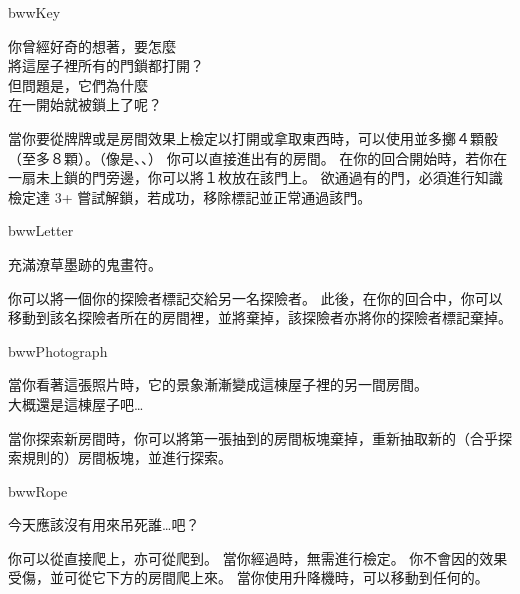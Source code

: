 \begin{OmenCard}{bww}{Key}{}
  \begin{CardStory}
    你曾經好奇的想著，要怎麼\\
    將這屋子裡所有的門鎖都打開？\\
    但問題是，它們為什麼\\
    在一開始就被鎖上了呢？
  \end{CardStory}
  \footnotesize
  當你要從牌牌或是房間效果上檢定以打開或拿取東西時，可以使用\ThisName{}並多擲４顆骰（至多８顆）。（像是、、）\smallbreak
  你可以直接進出有的房間。\smallbreak
  在你的回合開始時，若你在一扇未上鎖的門旁邊，你可以將１枚放在該門上。\smallbreak
  欲通過有的門，必須進行知識檢定達 3+ 嘗試解鎖，若成功，移除標記並正常通過該門。
\end{OmenCard}%
\linebreak[0]%
\begin{OmenCard}{bww}{Letter}{}
  \begin{CardStory}
    充滿潦草墨跡的鬼畫符。
  \end{CardStory}
  你可以將一個你的探險者標記交給另一名探險者。\smallbreak
  此後，在你的回合中，你可以移動到該名探險者所在的房間裡，並將\ThisName{}棄掉，該探險者亦將你的探險者標記棄掉。\smallbreak
\end{OmenCard}%
\linebreak[0]%
\begin{OmenCard}{bww}{Photograph}{}
  \begin{CardStory}
    當你看著這張照片時，它的景象漸漸變成這棟屋子裡的另一間房間。\\
    大概還是這棟屋子吧…
  \end{CardStory}
  當你探索新房間時，你可以將第一張抽到的房間板塊棄掉，重新抽取新的（合乎探索規則的）房間板塊，並進行探索。\smallbreak
\end{OmenCard}%
\linebreak[0]%
\begin{OmenCard}{bww}{Rope}{}
  \begin{CardStory}
    今天應該沒有用來吊死誰…吧？
  \end{CardStory}
  你可以從直接爬上，亦可從爬到。\smallbreak
  當你經過時，無需進行檢定。\smallbreak
  你不會因的效果受傷，並可從它下方的房間爬上來。\smallbreak
  當你使用升降機時，可以移動到任何的。\smallbreak
\end{OmenCard}%
\linebreak[0]%
